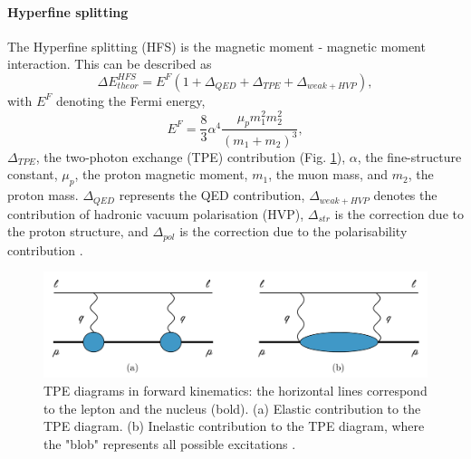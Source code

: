 \documentclass[12pt]{article}
\begin{document}
\paragraph{Hyperfine splitting}
The Hyperfine splitting (HFS) is the magnetic moment - magnetic moment interaction. This can be described \cite{proposal} as
\begin{equation}
\Delta{E}^{HFS}_{theor} = E^F(1 + {\Delta}_{QED} + {\Delta}_{TPE} + {\Delta}_{weak + HVP}),
\end{equation}
with $E^F$ denoting the Fermi energy,
\begin{equation}
E^F = \frac{8}{3}{\alpha}^4 \frac{{\mu}_p{m_1^2}{m_2^2}}{(m_1+m_2)^3},
\end{equation}
${\Delta}_{TPE}$, the two-photon exchange (TPE) contribution (Fig. \ref{fig:tpediagram}), $\alpha$, the fine-structure constant, ${\mu}_p$, the proton magnetic moment, $m_1$, the muon mass, and $m_2$, the proton mass. ${\Delta}_{QED}$ represents the QED contribution, ${\Delta}_{weak+HVP}$ denotes the contribution of hadronic vacuum polarisation (HVP), ${\Delta}_{str}$ is the correction due to the proton structure, and ${\Delta}_{pol}$ is the correction due to the polarisability contribution \cite{martynenko}.
\begin{figure}[h]
\centering
\includegraphics[width=1.0\textwidth]{img/tpediagramms}
\caption{TPE diagrams in forward kinematics: the horizontal lines correspond to the lepton and the nucleus (bold). (a) Elastic contribution to the TPE diagram. (b) Inelastic contribution to the TPE diagram, where the "blob" represents all possible excitations \cite{franziska}.}
\label{fig:tpediagram}
\end{figure} 
\end{document}
